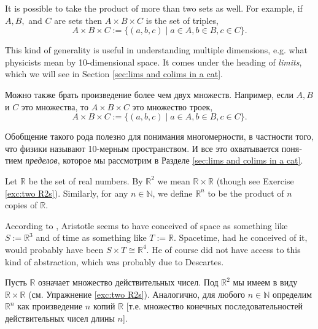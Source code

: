 \documentclass[a4paper]{book}
\def\RR{{\mathbb R}}
\def\NN{{\mathbb N}}
\def\iso{\cong}
\def\|{{\;|\;}}
\theoremstyle{myth}
\newtheorem{remarkENG}[envENG]{\begin{english}Remark\end{english}}
\newtheorem{exampleENG}[envENG]{\begin{english}Example\end{english}}
\newtheorem{remarkRUS}[envRUS]{\begin{russian}Примечание\end{russian}}
\newtheorem{exampleRUS}[envRUS]{\begin{russian}Пример\end{russian}}
\begin{document}
\begin{english}
\begin{remarkENG}
It is possible to take the product of more than two sets as well. For example, if $A,B,$ and $C$ are sets then $A\times B\times C$ is the set of triples, 
$$A\times B\times C:=\{(a,b,c)\|a\in A, b\in B, c\in C\}.$$

This kind of generality is useful in understanding multiple dimensions, e.g. what physicists mean by 10-dimensional space. It comes under the heading of {\em limits}, which we will see in Section \ref{sec:lims and colims in a cat}.
\end{remarkENG}

\begin{remarkRUS}
\begin{russian}Можно также брать произведение более чем двух множеств. Например, если $A,B$ и $C$ это множества, то $A\times B\times C$ это множество троек, 
$$A\times B\times C:=\{(a,b,c)\|a\in A, b\in B, c\in C\}.$$

Обобщение такого рода полезно для понимания многомерности, в частности того, что физики называют 10-мерным пространством. И все это охватывается понятием {\em пределов}, которое мы рассмотрим в Разделе \ref{sec:lims and colims in a cat}.\end{russian}
\end{remarkRUS}

\begin{exampleENG}\label{ex:R2}
Let $\RR$\index{a symbol!$\RR$} be the set of real numbers. By $\RR^2$ we mean $\RR\times\RR$ (though see Exercise \ref{exc:two R2s}). Similarly, for any $n\in\NN$, we define $\RR^n$ to be the product of $n$ copies of $\RR$. 

According to \cite{Pen}, Aristotle seems to have conceived of space as something like $S:=\RR^3$ and of time as something like $T:=\RR$. Spacetime, had he conceived of it, would probably have been $S\times T\iso\RR^4$. He of course did not have access to this kind of abstraction, which was probably due to Descartes. 
\end{exampleENG}

\begin{exampleRUS}\label{ex:R2}
\begin{russian}Пусть $\RR$\index{a symbol!$\RR$} означает множество действительных чисел. Под $\RR^2$ мы имеем в виду $\RR\times\RR$ (см. Упражнение \ref{exc:two R2s}). Аналогично, для любого $n\in\NN$ определим $\RR^n$ как произведение $n$ копий $\RR$ [т.е. множество конечных последовательностей действительных чисел длины $n$]. 


\end{russian}
\end{exampleRUS}
\end{english}
\end{document}
